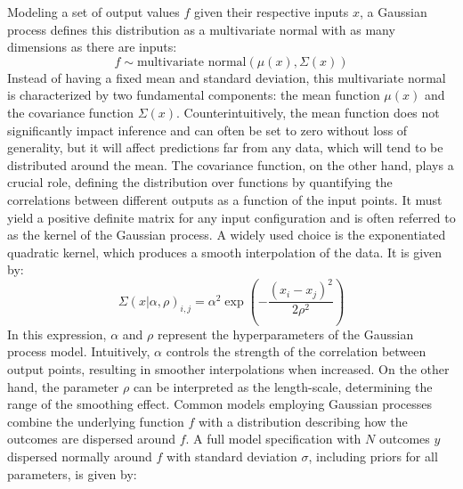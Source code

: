 Modeling a set of output values \(f\) given their respective inputs \(x\), a Gaussian process defines this distribution as a multivariate normal with as many dimensions as there are inputs:
\[
f \sim \text{multivariate normal}(\mu(x),\Sigma(x)) \label{eq:gaussian-process} \tag{2.58}
\]
Instead of having a fixed mean and standard deviation, this multivariate normal is characterized by two fundamental components: the mean function \(\mu(x)\) and the covariance function \(\Sigma(x)\). Counterintuitively, the mean function does not significantly impact inference and can often be set to zero without loss of generality, but it will affect predictions far from any data, which will tend to be distributed around the mean. The covariance function, on the other hand, plays a crucial role, defining the distribution over functions by quantifying the correlations between different outputs as a function of the input points. It must yield a positive definite matrix for any input configuration and is often referred to as the kernel of the Gaussian process. A widely used choice is the exponentiated quadratic kernel, which produces a smooth interpolation of the data. It is given by:
\[
\Sigma(x | \alpha, \rho)_{i,j} = \alpha^2 \exp\left(-\frac{(x_i - x_j)^2}{2\rho^2}\right) \label{eq:exponential-quadratic-kernel} \tag{2.59}
\]
In this expression, \(\alpha\) and \(\rho\) represent the hyperparameters of the Gaussian process model. Intuitively,
\(\alpha\) controls the strength of the correlation between output points, resulting in smoother interpolations when
increased. On the other hand, the parameter \(\rho\) can be interpreted as the length-scale, determining the range of
the smoothing effect. Common models employing Gaussian processes combine the underlying function \(f\) with a
distribution describing how the outcomes are dispersed around \(f\). A full model specification with $N$ outcomes $y$
dispersed normally around  $f$ with standard deviation \(\sigma\), including priors for all parameters, is given by:

